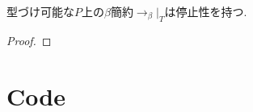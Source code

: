 \documentclass[12pt, titlepage]{ltjsarticle}
\DeclareMathOperator{\SAT}{SAT}
\DeclareMathOperator{\GTerm}{\Gamma-Term}
\newcommand{\iprt}[2]{\llbracket {#1} \rrbracket_ {#2}}
\begin{document}



\begin{thm}
 型づけ可能な$P$上の$\beta$簡約$\rightarrow_{\beta}|_T$は停止性を持つ.
\end{thm}
\begin{proof}
\end{proof}






\appendix
\section{Code}
\end{document}
